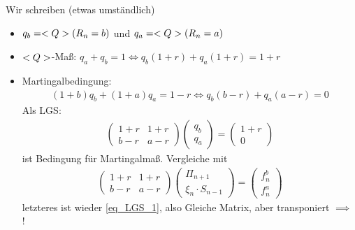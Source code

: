 \begin{*remark}
	Wir schreiben (etwas umständlich) 
	\begin{itemize}
		\item $q_b = <Q>(R_n = b)$ und $q_a = <Q>(R_n = a)$
		\item $<Q>$-Maß: $q_a + q_b = 1 \Leftrightarrow q_b(1+r) + q_a (1+r) = 1+r$
		\item Martingalbedingung:
		\begin{align*}
			 (1+b)q_b + (1+a)q_a = 1-r \Leftrightarrow q_b(b-r) + q_a(a-r) = 0
		\end{align*}
		Als LGS:
		\begin{align*}
			\begin{pmatrix}
				1+r & 1+r \\
				b-r & a-r
			\end{pmatrix}
			\begin{pmatrix}
			q_b\\ q_a
			\end{pmatrix} =
			\begin{pmatrix}
				1+r\\ 0
			\end{pmatrix} \tag{LGS-2}\label{eq_2_4_LGS2}
		\end{align*}
		ist Bedingung für Martingalmaß. Vergleiche mit
		\begin{align*}
		\begin{pmatrix}
		1+r & 1+r \\
		b-r & a-r
		\end{pmatrix}
		\begin{pmatrix}
		\Pi_{n+1}\\ \xi_n \cdot S_{n-1}
		\end{pmatrix} =
		\begin{pmatrix}
		f_n^b\\ f_n^a
		\end{pmatrix}
		\end{align*}
		letzteres ist wieder \eqref{eq_LGS_1}, also Gleiche Matrix, aber transponiert $\implies$ !
	\end{itemize}  
\end{*remark}

